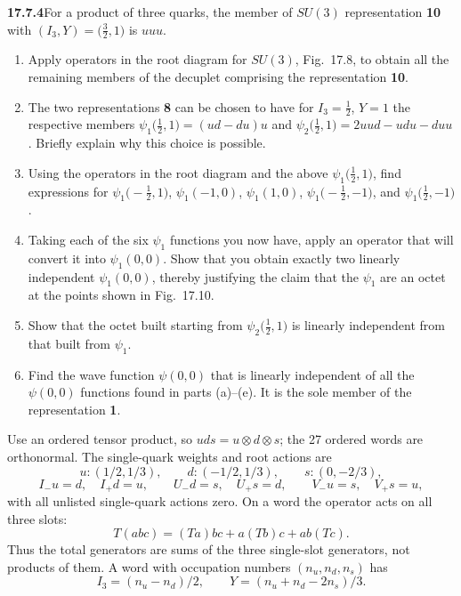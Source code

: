 \par\bigskip
\noindent\textbf{17.7.4}\quad For a product of three quarks, the
member of $SU(3)$ representation \textbf{10} with
$(I_{3},Y)=\big(\tfrac{3}{2},1\big)$ is $uuu$.
\begin{enumerate}
\item[(a)] Apply operators in the root diagram for $SU(3)$,
Fig.~17.8, to obtain all the remaining members of the decuplet
comprising the representation \textbf{10}.
\item[(b)] The two representations \textbf{8} can be chosen to have
for $I_{3}=\tfrac{1}{2}$, $Y=1$ the respective members
$\psi_{1}\big(\tfrac{1}{2},1\big)=(ud-du)u$ and
$\psi_{2}\big(\tfrac{1}{2},1\big)=2uud-udu-duu$. Briefly explain why
this choice is possible.
\item[(c)] Using the operators in the root diagram and the above
$\psi_{1}\big(\tfrac{1}{2},1\big)$, find expressions for
$\psi_{1}\big(-\tfrac{1}{2},1\big)$, $\psi_{1}(-1,0)$,
$\psi_{1}(1,0)$, $\psi_{1}\big(-\tfrac{1}{2},-1\big)$, and
$\psi_{1}\big(\tfrac{1}{2},-1\big)$.
\item[(d)] Taking each of the six $\psi_{1}$ functions you now have,
apply an operator that will convert it into $\psi_{1}(0,0)$. Show
that you obtain exactly two linearly independent $\psi_{1}(0,0)$,
thereby justifying the claim that the $\psi_{1}$ are an octet at the
points shown in Fig.~17.10.
\item[(e)] Show that the octet built starting from
$\psi_{2}\big(\tfrac{1}{2},1\big)$ is linearly independent from that
built from $\psi_{1}$.
\item[(f)] Find the wave function $\psi(0,0)$ that is linearly
independent of all the $\psi(0,0)$ functions found in parts
(a)--(e). It is the sole member of the representation \textbf{1}.
\end{enumerate}
\par{}
\solution
{}

Use an ordered tensor product, so $uds=u\otimes d\otimes s$;
the 27 ordered words are orthonormal.
The single-quark weights and root actions are
\[
u:(1/2,1/3),\qquad d:(-1/2,1/3),\qquad s:(0,-2/3),
\]
\[
I_-u=d,\quad I_+d=u,\qquad
U_-d=s,\quad U_+s=d,\qquad
V_-u=s,\quad V_+s=u,
\]
with all unlisted single-quark actions zero.
On a word the operator acts on all three slots:
\[
T(abc)=(Ta)bc+a(Tb)c+ab(Tc).
\]
Thus the total generators are sums of the three single-slot
generators, not products of them. A word with occupation numbers
$(n_u,n_d,n_s)$ has
\[
I_3=(n_u-n_d)/2,\qquad Y=(n_u+n_d-2n_s)/3.
\]


